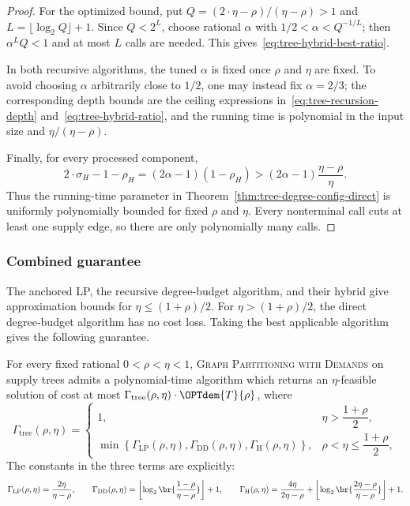 \begin{proof}
    For the optimized bound, put $Q=(2\cdot\eta-\rho)/(\eta-\rho)>1$ and $L=\lfloor\log_2Q\rfloor+1$. Since $Q<2^L$, choose rational $\alpha$ with $1/2<\alpha<Q^{-1/L}$; then $\alpha^LQ<1$ and at most $L$ calls are needed. This gives~\eqref{eq:tree-hybrid-best-ratio}.

    In both recursive algorithms, the tuned $\alpha$ is fixed once $\rho$ and $\eta$ are fixed. To avoid choosing $\alpha$ arbitrarily close to $1/2$, one may instead fix $\alpha=2/3$; the corresponding depth bounds are the ceiling expressions in~\eqref{eq:tree-recursion-depth} and~\eqref{eq:tree-hybrid-ratio}, and the running time is polynomial in the input size and $\eta/(\eta-\rho)$.

    Finally, for every processed component,
    \[
        2\cdot\sigma_H-1-\rho_H
        =(2\alpha-1)(1-\rho_H)
        >(2\alpha-1)\frac{\eta-\rho}{\eta}.
    \]
    Thus the running-time parameter in Theorem~\ref{thm:tree-degree-config-direct} is uniformly polynomially bounded for fixed $\rho$ and $\eta$. Every nonterminal call cuts at least one supply edge, so there are only polynomially many calls.
\end{proof}

\subsubsection{Combined guarantee}

The anchored LP, the recursive degree-budget algorithm, and their hybrid give approximation bounds for $\eta\leq(1+\rho)/2$. For $\eta>(1+\rho)/2$, the direct degree-budget algorithm has no cost loss. Taking the best applicable algorithm gives the following guarantee.

\begin{corollary}\label{cor:tree-best-bicriteria}
    For every fixed rational $0<\rho<\eta<1$, \textsc{Graph Partitioning with Demands} on supply trees admits a polynomial-time algorithm which returns an $\eta$-feasible solution of cost at most $
        \Gamma_{\mathrm{tree}}(\rho,\eta)\cdot \OPTdem{T}{\rho}$,
    where
    \[
        \Gamma_{\mathrm{tree}}(\rho,\eta)
        =
        \begin{cases}
            1,
                &\eta>\dfrac{1+\rho}{2},\\[2mm]
            \displaystyle
            \min\left\{
                \Gamma_{\mathrm{LP}}(\rho,\eta),
                \Gamma_{\mathrm{DD}}(\rho,\eta),
                \Gamma_{\mathrm{H}}(\rho,\eta)
            \right\},
                &\rho<\eta\leq\dfrac{1+\rho}{2},
        \end{cases}
    \]
    The constants in the three terms are explicitly:
    \[
        \Gamma_{\mathrm{LP}}(\rho,\eta)=\frac{2\eta}{\eta-\rho},
        \qquad
        \Gamma_{\mathrm{DD}}(\rho,\eta)=\left\lfloor
            \log_2\br{\frac{1-\rho}{\eta-\rho}}
        \right\rfloor+1,
        \qquad
        \Gamma_{\mathrm{H}}(\rho,\eta)=\frac{4\eta}{2\eta-\rho}
            +\left\lfloor
                \log_2\br{\frac{2\eta-\rho}{\eta-\rho}}
            \right\rfloor+1.
    \]
\end{corollary}


